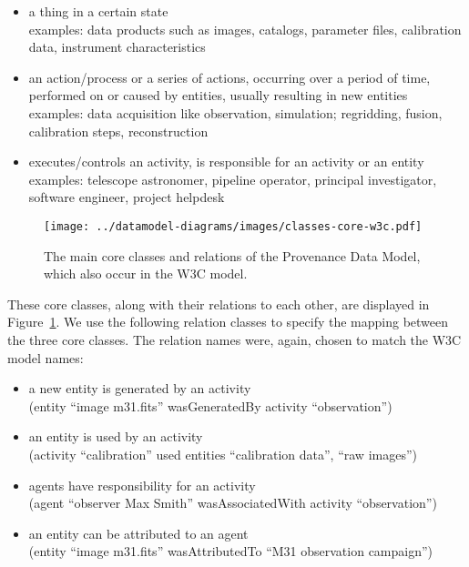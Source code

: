 \begin{itemize}
\item {} a thing in a certain state\\
    examples: data products such as images, catalogs, parameter files,
calibration data, instrument characteristics

\item {} an action\slash{}process or a series of actions,
    occurring over a period of time, performed on or caused by entities,
    usually resulting in new entities\\ examples: data acquisition like
    observation, simulation; regridding, fusion, calibration steps,
    reconstruction

\item {} executes\slash{}controls an activity, is responsible for
    an activity or an entity\\ examples: telescope astronomer,
    pipeline operator, principal investigator, software engineer,
    project helpdesk

\end{itemize}

\noindent



\begin{figure}[h]
\centering
\texttt{[image: ../datamodel-diagrams/images/classes-core-w3c.pdf]}
\caption[Core classes and relations of the Provenance Data Model]{The main core classes and relations of the Provenance Data Model, which also occur in the W3C model.}
\label{fig:coreclasses}
\end{figure}

These core classes, along with their relations to each other, are displayed in
Figure~\ref{fig:coreclasses}. We use the following relation classes to specify
the mapping between the three core  classes. 
The relation names were, again, chosen to match the W3C model names:
\begin{itemize}
\item {} a new entity is generated by an activity\\
        (entity ``image m31.fits'' wasGeneratedBy activity ``observation'')
\item {} an entity is used by an activity\\
        (activity ``calibration'' used entities ``calibration data'', ``raw images'')
\item {} agents have responsibility for an activity\\
        (agent ``observer Max Smith'' wasAssociatedWith activity ``observation'')
\item {} an entity can be attributed to an agent\\
        (entity ``image m31.fits'' wasAttributedTo ``M31 observation campaign'')
\end{itemize}

